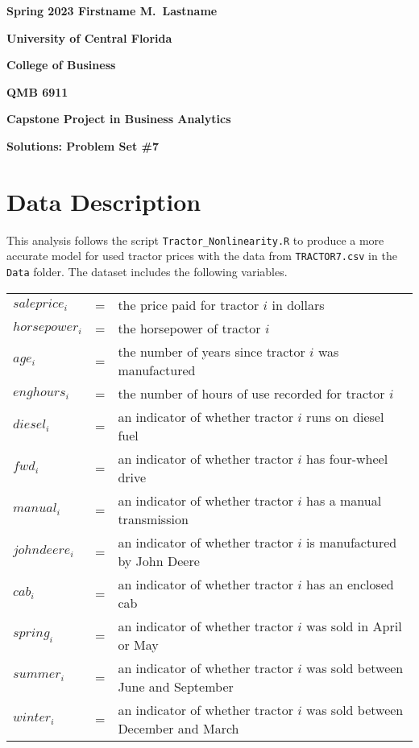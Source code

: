 \documentclass[11pt]{paper}
\begin{document}

\pagestyle{empty}
{\noindent\bf Spring 2023 \hfill Firstname M.~Lastname}
\vskip 16pt
\centerline{\bf University of Central Florida}
\centerline{\bf College of Business}
\vskip 16pt
\centerline{\bf QMB 6911}
\centerline{\bf Capstone Project in Business Analytics}
\vskip 10pt
\centerline{\bf Solutions:  Problem Set \#7}
\vskip 32pt
\noindent

\section{Data Description}

This analysis follows the script \texttt{Tractor\_Nonlinearity.R} to produce a more accurate model for used tractor prices with the data from \texttt{TRACTOR7.csv} in the \texttt{Data} folder. 
The dataset includes the following variables.
\begin{table}[h!]
\begin{tabular}{l l l}

$saleprice_i$ & = & the price paid for tractor $i$ in dollars \\
% 
$horsepower_i$ & = & the horsepower of tractor $i$ \\
$age_i$ & = & the number of years since tractor $i$ was manufactured  \\
$enghours_i$ & = & the number of hours of use recorded for tractor $i$  \\
$diesel_i$ & = & an indicator of whether tractor $i$ runs on diesel fuel \\ %
$fwd_i$ & = & an indicator of whether tractor $i$ has four-wheel drive \\ %
$manual_i$ & = & an indicator of whether tractor $i$ has a manual transmission \\ %
$johndeere_i$ & = & an indicator of whether tractor $i$ is manufactured by John Deere \\ %
$cab_i$ & = & an indicator of whether tractor $i$ has an enclosed cab \\ %
% 
$spring_i$ & = & an indicator of whether tractor $i$ was sold in April or May \\ %
$summer_i$ & = & an indicator of whether tractor $i$ was sold between June and September \\ %
$winter_i$ & = & an indicator of whether tractor $i$ was sold between December and March \\ %

\end{tabular}
\end{table}
%
\end{document}
